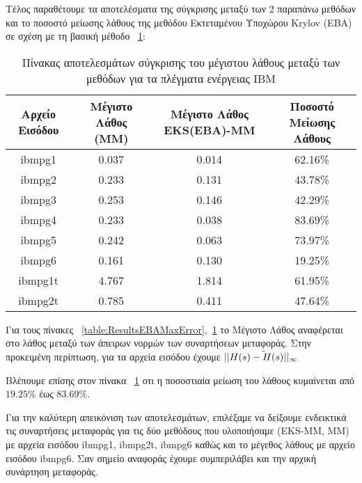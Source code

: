 Τέλος παραθέτουμε τα αποτελέσματα της σύγκρισης μεταξύ των 2 παραπάνω μεθόδων και το ποσοστό μείωσης λάθους της μεθόδου Εκτεταμένου Υποχώρου \textlatin{Krylov} (\textlatin{EBA}) σε σχέση με τη βασική μέθοδο ~\ref{table:ResultsEBAMaxErrorCompared}:

\begin{table}[h!]
\centering
 \begin{tabular}{||c | c | c | c||} 
 \hline
 Αρχείο Εισόδου & Μέγιστο Λάθος (\textlatin{MM}) & Μέγιστο Λάθος \textlatin{EKS(EBA)-MM} & Ποσοστό Μείωσης Λάθους \\ [0.5ex] 
 \hline\hline
 \textlatin{ibmpg1} & 0.037  & 0.014 & 62.16\% \\ 
 \hline
 \textlatin{ibmpg2} & 0.233 & 0.131 & 43.78\% \\
 \hline
 \textlatin{ibmpg3} & 0.253 & 0.146 & 42.29\% \\
 \hline
 \textlatin{ibmpg4} & 0.233 & 0.038 & 83.69\% \\
 \hline
 \textlatin{ibmpg5} & 0.242 & 0.063 & 73.97\% \\
 \hline
 \textlatin{ibmpg6} & 0.161 & 0.130 & 19.25\% \\
 \hline
 \textlatin{ibmpg1t} & 4.767 &  1.814 & 61.95\% \\
 \hline
 \textlatin{ibmpg2t} & 0.785 &  0.411 & 47.64\% \\
 \hline
\end{tabular}
\caption{Πίνακας αποτελεσμάτων σύγκρισης του μέγιστου λάθους μεταξύ των μεθόδων για τα πλέγματα ενέργειας \textlatin{IBM}}
\label{table:ResultsEBAMaxErrorCompared}
\end{table}

Για τους πίνακες ~\ref{table:ResultsEBAMaxError},~\ref{table:ResultsEBAMaxErrorCompared} το Μέγιστο Λάθος αναφέρεται στο λάθος μεταξύ των άπειρων νορμών των συναρτήσεων μεταφοράς. Στην προκειμένη περίπτωση, για τα αρχεία εισόδου έχουμε $|| \Tilde{H(s) - H(s)||_\infty}$


Βλέπουμε επίσης στον πίνακα ~\ref{table:ResultsEBAMaxErrorCompared} οτι η ποσοστιαία μείωση του λάθους κυμαίνεται από $19.25\%$ έως $83.69\%$.

Για την καλύτερη απεικόνιση των αποτελεσμάτων, επιλέξαμε να δείξουμε ενδεικτικά τις συναρτήσεις μεταφοράς για τις δύο μεθόδους που υλοποιήσαμε (\textlatin{EKS-MM, MM}) με αρχεία εισόδου \textlatin{ibmpg1, ibmpg2t, ibmpg6} καθώς και το μέγεθος λάθους με αρχείο εισόδου \textlatin{ibmpg6}. Σαν σημείο αναφοράς έχουμε συμπεριλάβει και την αρχική συνάρτηση μεταφοράς.


